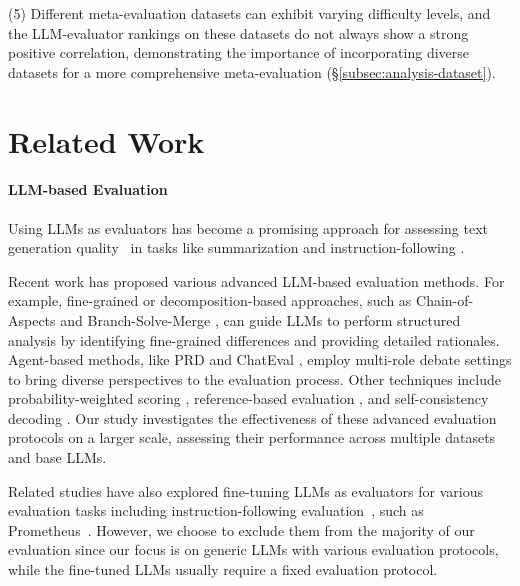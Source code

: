 \documentclass[11pt]{article}
\begin{document}
\noindent (5) Different meta-evaluation datasets can exhibit varying difficulty levels, and the LLM-evaluator rankings on these datasets do not always show a strong positive correlation, demonstrating the importance of incorporating diverse datasets for a more comprehensive meta-evaluation (\S\ref{subsec:analysis-dataset}).

% 


% 





\section{Related Work}
\label{sec:related-work}


\paragraph{LLM-based Evaluation} Using LLMs as evaluators has become a promising approach for assessing text generation quality~\citep{chiang-lee-2023-large, fu2023gptscore, liu-etal-2023-g} in tasks like summarization \citep{fu2023gptscore, liu-etal-2023-g, liu-etal-2023-revisiting} and instruction-following \citep{zheng2024judging, zeng2024evaluating, alpaca_eval}. 
%

Recent work has proposed various advanced LLM-based evaluation methods. 
For example, fine-grained or decomposition-based approaches, such as Chain-of-Aspects \citep{gong2023coascore} and Branch-Solve-Merge \citep{saha2023branchsolvemerge}, can guide LLMs to perform structured analysis by identifying fine-grained differences and providing detailed rationales. 
Agent-based methods, like PRD \citep{li2023prd} and ChatEval \citep{chan2024chateval}, employ multi-role debate settings to bring diverse perspectives to the evaluation process.
Other techniques include probability-weighted scoring \citep{liu-etal-2023-g}, reference-based evaluation \citep{zeng2024evaluating}, and self-consistency decoding \citep{wang2023selfconsistency}. 
Our study investigates the effectiveness of these advanced evaluation protocols on a larger scale, assessing their performance across multiple datasets and base LLMs.

Related studies have also explored fine-tuning LLMs as evaluators for various evaluation tasks including instruction-following evaluation~\cite{li2023generative, wang2024direct}, such as Prometheus~\cite{kim2024prometheus}. 
However, we choose to exclude them from the majority of our evaluation since our focus is on generic LLMs with various evaluation protocols, while the fine-tuned LLMs usually require a fixed evaluation protocol.
\end{document}
